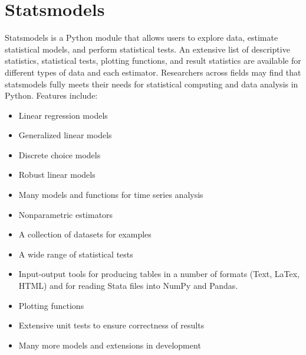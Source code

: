 \section{Statsmodels}
Statsmodels is a Python module that allows users to explore data, estimate statistical models, and perform statistical tests. 
An extensive list of descriptive statistics, statistical tests, plotting functions, and result statistics are available for different types of 
data and each estimator. Researchers across fields may find that statsmodels fully meets their needs for statistical computing and data analysis 
in Python. Features include:


\begin{itemize}

\item Linear regression models

\item Generalized linear models

\item Discrete choice models

\item Robust linear models

\item Many models and functions for time series analysis

\item Nonparametric estimators

\item A collection of datasets for examples

\item A wide range of statistical tests

\item Input-output tools for producing tables in a number of formats (Text, LaTex, HTML) and for reading Stata files into NumPy and Pandas.

\item Plotting functions

\item Extensive unit tests to ensure correctness of results

\item Many more models and extensions in development

\end{itemize}
